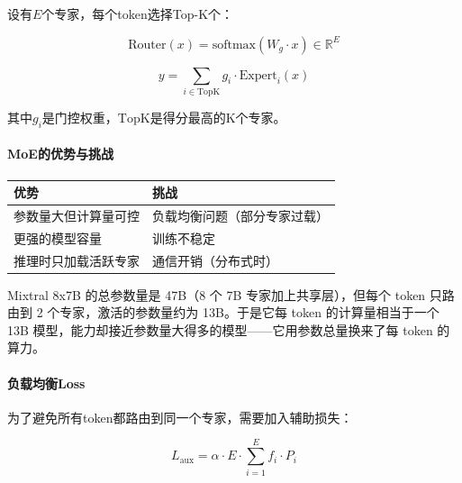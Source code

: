 \begin{keyformula}[title=MoE计算公式]
设有$E$个专家，每个token选择Top-K个：

\begin{equation}
    \text{Router}(x) = \text{softmax}(W_g \cdot x) \in \mathbb{R}^E
\end{equation}

\begin{equation}
    y = \sum_{i \in \text{TopK}} g_i \cdot \text{Expert}_i(x)
\end{equation}

其中$g_i$是门控权重，$\text{TopK}$是得分最高的K个专家。
\end{keyformula}

\paragraph{MoE的优势与挑战}\mbox{}\par\nopagebreak

\begin{table}[H]
\centering
\renewcommand{\arraystretch}{1.3}
\begin{tabular}{l|l}
\toprule
\textbf{优势} & \textbf{挑战} \\
\midrule
参数量大但计算量可控 & 负载均衡问题（部分专家过载） \\
更强的模型容量 & 训练不稳定 \\
推理时只加载活跃专家 & 通信开销（分布式时） \\
\bottomrule
\end{tabular}
\end{table}

\begin{example}
Mixtral 8x7B 的总参数量是 47B（8 个 7B 专家加上共享层），但每个 token 只路由到 2 个专家，激活的参数量约为 13B。于是它每 token 的计算量相当于一个 13B 模型，能力却接近参数量大得多的模型——它用参数总量换来了每 token 的算力。
\end{example}

\paragraph{负载均衡Loss}

为了避免所有token都路由到同一个专家，需要加入辅助损失：

\begin{equation}
    L_{\text{aux}} = \alpha \cdot E \cdot \sum_{i=1}^{E} f_i \cdot P_i
\end{equation}

